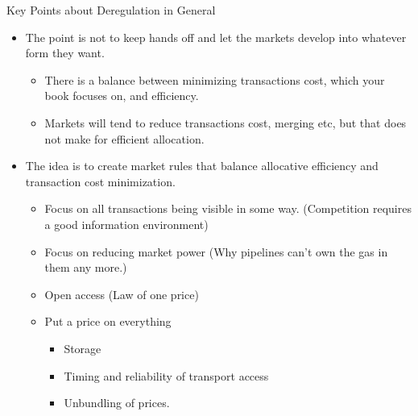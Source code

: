 \documentclass[
  ignorenonframetext,
]{beamer}
\providecommand{\tightlist}{%
  \setlength{\itemsep}{0pt}\setlength{\parskip}{0pt}}
\begin{document}
\begin{frame}{Key Points about Deregulation in General}
\protect\hypertarget{key-points-about-deregulation-in-general}{}

\begin{itemize}
\tightlist
\item
  The point is not to keep hands off and let the markets develop into
  whatever form they want.

  \begin{itemize}
  \tightlist
  \item
    There is a balance between minimizing transactions cost, which your
    book focuses on, and efficiency.
  \item
    Markets will tend to reduce transactions cost, merging etc, but that
    does not make for efficient allocation.
  \end{itemize}
\item
  The idea is to create market rules that balance allocative efficiency
  and transaction cost minimization.

  \begin{itemize}
  \tightlist
  \item
    Focus on all transactions being visible in some way. (Competition
    requires a good information environment)
  \item
    Focus on reducing market power (Why pipelines can't own the gas in
    them any more.)
  \item
    Open access (Law of one price)
  \item
    Put a price on everything

    \begin{itemize}
    \tightlist
    \item
      Storage
    \item
      Timing and reliability of transport access
    \item
      Unbundling of prices.
    \end{itemize}
  \end{itemize}
\end{itemize}

\end{frame}
\end{document}
